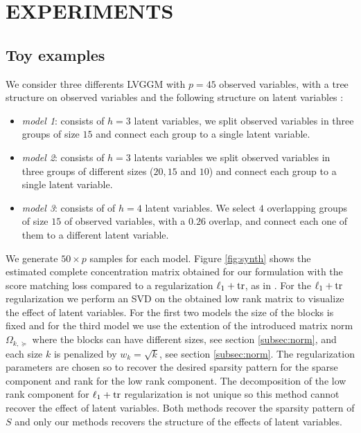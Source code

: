 \section{EXPERIMENTS}
\label{experiments}

\subsection{Toy examples}

We consider three differents LVGGM with $p=45$ observed variables, with a tree structure on observed variables and the following structure on latent variables :
\begin{itemize}
\item \textit{model 1}: consists of $h=3$ latent variables, we split observed variables in three groups of size $15$ and connect each group to a single latent variable.
\item \textit{model 2}: consists of $h=3$ latents variables we split observed variables in three groups of different sizes ($20,15$ and $10$) and connect each group to a single latent variable.
\item \textit{model 3}: consists of of $h=4$ latent variables. We select $4$ overlapping groups of size $15$ of observed variables, with a $0.26$ overlap, and connect each one of them to a different latent variable.
\end{itemize}


We generate $50\times p$ samples for each model. Figure \ref{fig:synth} shows the estimated complete concentration matrix obtained for our formulation with the score matching loss compared to a regularization $\ell_1+{\rm tr}$, as in \citet{chandrasekaran2010}. For  the $\ell_1+{\rm tr}$ regularization we perform an SVD on the obtained low rank matrix to visualize the effect of latent variables. For the first two models the size of the blocks is fixed and for the third model we use the extention of the introduced matrix norm $\Omega_{k,\succeq}$ where the blocks can have different sizes, see section \ref{subsec:norm},  and each size $k$ is penalized by $w_{k}=\sqrt{k}$, see section \ref{subsec:norm}. The regularization parameters are chosen so to recover the desired sparsity pattern for the sparse component and rank for the low rank component.  The decomposition of the low rank component for $\ell_1+{\rm tr}$ regularization is not unique so this method cannot recover the effect of latent variables. Both methods recover the sparsity pattern of $S$ and only our methods recovers the structure of the effects of latent variables.

